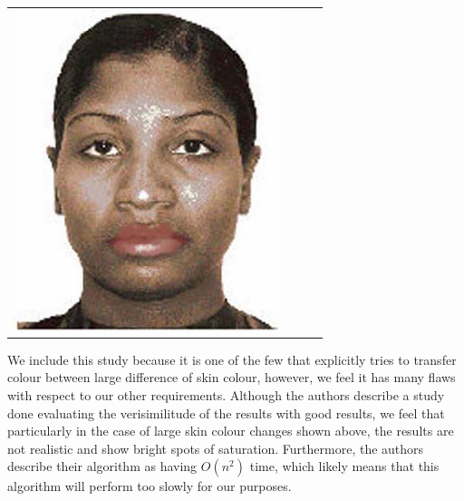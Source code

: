 \begin{longtable}{|N||c|c|c|}
\begin{minipage}{.29\textwidth}
    \includegraphics[width=\textwidth,height=\textheight,keepaspectratio]{images/yin_result1}
  \end{minipage} \\
\end{longtable}

We include this study because it is one of the few that explicitly tries to transfer colour between large difference of skin colour, however, we feel it has many flaws with respect to our other requirements. Although the authors describe a study done evaluating the verisimilitude of the results with good results, we feel that particularly in the case of large skin colour changes shown above, the results are not realistic and show bright spots of saturation. Furthermore, the authors describe their algorithm as having $O(n^2)$ time, which likely means that this algorithm will perform too slowly for our purposes.



